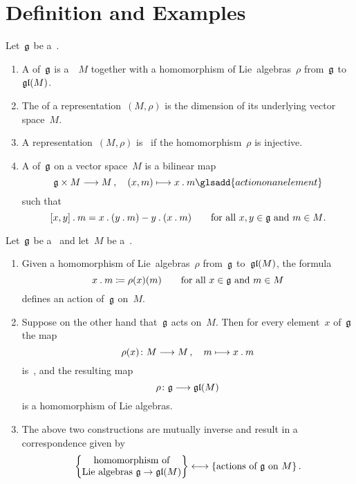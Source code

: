 \section{Definition and Examples}


\begin{definition}
	Let~$\mathfrak{g}$ be a~{\liealgebra{$\kf$}}.
	\begin{enumerate}
		\item
			A  of~$\mathfrak{g}$ is a~{\vectorspace{$\kf$}}~$M$ together with a homomorphism of Lie~algebras~$\rho$ from~$\mathfrak{g}$ to~$\mathfrak{gl}(M)$.
		\item
			The  of a representation~$(M, \rho)$ is the dimension of its underlying vector space~$M$.
		\item
			A representation~$(M, \rho)$ is~ if the homomorphism~$\rho$ is injective.
		\item
			A  of~$\mathfrak{g}$ on a vector space~$M$ is a bilinear map
			\[
				\glie \times M \to M \,,
				\quad
				(x,m) \mapsto x \act m
				\glsadd{action on an element}
			\]
			such that
			\[
				[x,y] \mathbin{.} m
				=
				x \mathbin{.} (y \mathbin{.} m) - y \mathbin{.} (x \mathbin{.} m)
				\qquad
				\text{for all~$x, y \in \mathfrak{g}$ and~$m \in M$.}
			\]
	\end{enumerate}
\end{definition}


\begin{proposition}
	\label{correspodence between representations and actions}
	Let~$\mathfrak{g}$ be a~\liealgebra{$\kf$} and let~$M$ be a~\vectorspace{$\kf$}.
	\begin{enumerate}
		\item
			Given a homomorphism of Lie~algebras~$\rho$ from~$\mathfrak{g}$ to~$\mathfrak{gl}(M)$, the formula
			\[
				x \mathbin{.} m \coloneqq \rho(x)(m)
				\qquad
				\text{for all~$x \in \mathfrak{g}$ and~$m \in M$}
			\]
			defines an action of~$\mathfrak{g}$ on~$M$.
		\item
			Suppose on the other hand that~$\mathfrak{g}$ acts on~$M$.
			Then for every element~$x$ of~$\mathfrak{g}$ the map
			\[
				\rho(x) \colon M \to M \,,
				\quad
				m \mapsto x \act m
			\]
			is~\linear{$\kf$}, and the resulting map
			\[
				\rho \colon \glie \to \gllie(M)
			\]
			is a homomorphism of Lie algebras.
		\item
			The above two constructions are mutually inverse and result in a {\onetoonetext} correspondence given by
			\[
				\left\{
					\begin{tabular}{@{}c@{}}
						homomorphism of
						\\
						Lie~algebras~$\glie \to \gllie(M)$
					\end{tabular}
				\right\}
				\onetoone
				\{
					\text{actions of~$\glie$ on~$M$}
				\} \,.
			\]
	\end{enumerate}
\end{proposition}


